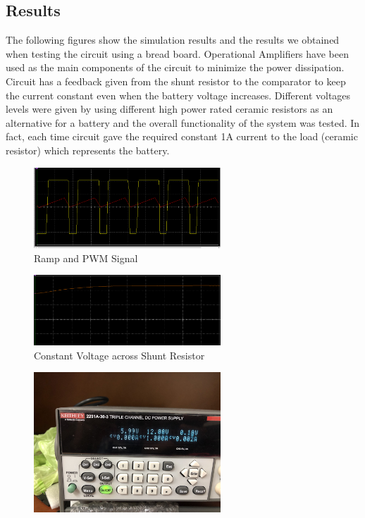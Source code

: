 \documentclass[a4paper,12pt]{article}
\begin{document}
\begin{multicols}{2}
\section{Results}
The following figures show the simulation results and the results we obtained when testing the circuit using a bread board. Operational Amplifiers have been used as the main components of the circuit to minimize the power dissipation.
Circuit has a feedback given from the shunt resistor to the comparator to keep the current constant even when the battery voltage increases. Different voltages levels were given by using different high power rated ceramic resistors as an alternative for a battery and the overall functionality of the system was tested. In fact, each time circuit gave the required constant 1A current to the load (ceramic resistor) which represents the battery.
\begin{figure}[H]
    \centering
    \includegraphics[width=7cm]{Ramp_PWM.png}
    \caption{Ramp and PWM Signal}
    \label{fig:Ramp_PWM_Result}
\end{figure}
\begin{figure}[H]
    \centering
    \includegraphics[width=7cm]{const_voltage.png}
    \caption{Constant Voltage across Shunt Resistor}
    \label{fig:Ramp_PWM}
\end{figure}
\begin{figure}[H]
    \centering
    \includegraphics[width=7cm]{1A_current.jpg}

\end{figure}
\end{multicols}
\end{document}
